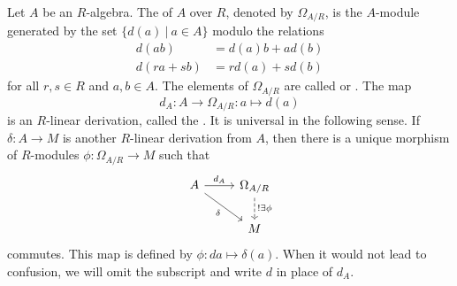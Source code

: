Let $A$ be an $R$-algebra.
The  of $A$ over $R$,
denoted by $\Omega_{A/R}$,
is the $A$-module generated by the set $\{ d(a) ~|~ a \in A \}$
modulo the relations
\begin{align*}
  d(ab) &= d(a)b + ad(b) \\
  d(ra + sb) &= rd(a) + sd(b)
\end{align*}
for all $r, s \in R$ and $a, b \in A$.
The elements of $\Omega_{A/R}$ are called  or .
The map
  \[ d_A : A \to \Omega_{A/R} : a \mapsto d(a) \]
is an $R$-linear derivation, called the .
It is universal in the following sense.
If $\delta : A \to M$ is another $R$-linear derivation from $A$,
then there is a unique morphism of $R$-modules $\phi : \Omega_{A/R} \to M$ such that
\[ \begin{tikzcd}
  A \arrow{r}{d_A} \arrow[swap]{dr}{\delta} & \Omega_{A/R} \arrow[dashed]{d}{!\exists \phi} \\ & M
\end{tikzcd} \]
commutes.
This map is defined by $\phi : da \mapsto \delta(a)$.
When it would not lead to confusion, we will omit the subscript and write $d$ in place of $d_A$.

\begin{comment}
\begin{proposition}
  A morphism $\phi : A \to B$ of $R$-algebras induces
  a morphism $\psi : \Omega_{A/R} \to \Omega_{B/R}$ of $A$-modules.
\end{proposition}
\begin{proof}
  Let $\phi : A \to B$ be a morphism of $R$-algebras.
  We have the following maps,
  \[ \begin{tikzcd}
      A \arrow{r}{d_A} \arrow[swap]{d}{\phi} & \Omega_{A/R} \\ B \arrow[swap]{r}{d_B} & \Omega_{B/R}.
    \end{tikzcd} \]
  By Proposition \ref{prop_precompose_derivation},
  the composition $d_B \circ \phi : A \to \Omega_{B/R}$ is an $R$-linear derivation.
  By the universal property of the universal derivation,
  there is a unique map $\psi : \Omega_{A/R} \to \Omega_{B/R}$ such that
  \[ \begin{tikzcd}
      A \arrow{r}{d_A} \arrow[swap]{dr}{d_B \circ \phi} & \Omega_{A/R} \arrow[dashed]{d}{\psi} \\ & \Omega_{B/R}
    \end{tikzcd} \]
  commutes.
\end{proof}
The induced map sends $d_Aa \mapsto d_B(\phi(a))$.
\end{comment}

